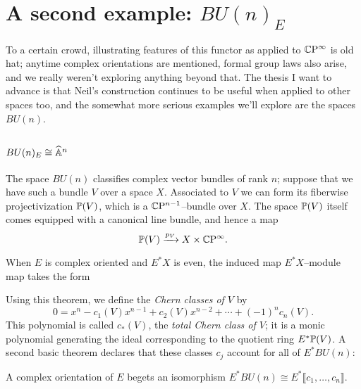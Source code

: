 \section{A second example: $BU(n)_E$}

To a certain crowd, illustrating features of this functor as applied to $\CP^\infty$ is old hat; anytime complex orientations are mentioned, formal group laws also arise, and we really weren't exploring anything beyond that.  The thesis I want to advance is that Neil's construction continues to be useful when applied to other spaces too, and the somewhat more serious examples we'll explore are the spaces $BU(n)$.

\subsection{$BU(n)_E \cong \A^n$}

The space $BU(n)$ classifies complex vector bundles of rank $n$; suppose that we have such a bundle $V$ over a space $X$.  Associated to $V$ we can form its fiberwise projectivization $\P(V)$, which is a $\CP^{n-1}$--bundle over $X$.  The space $\P(V)$ itself comes equipped with a canonical line bundle, and hence a map \[\P(V) \xrightarrow{p_V} X \times \CP^\infty.\]

\begin{theorem}
When $E$ is complex oriented and $E^* X$ is even, the induced map $E^* X$--module map takes the form
\begin{center}
\end{center}
\end{theorem}

\noindent Using this theorem, we define the \emph{Chern classes of $V$} by \[0 = x^n - c_1(V) x^{n-1} + c_2(V) x^{n-2} + \cdots + (-1)^n c_n(V).\]  This polynomial is called $c_*(V)$, the \emph{total Chern class of $V$}; it is a monic polynomial generating the ideal corresponding to the quotient ring $E^* \P(V)$.  A second basic theorem declares that these classes $c_j$ account for all of $E^* BU(n)$:

\begin{theorem}
A complex orientation of $E$ begets an isomorphism $E^* BU(n) \cong E^*\llbracket c_1, \ldots, c_n \rrbracket$.
\end{theorem}

